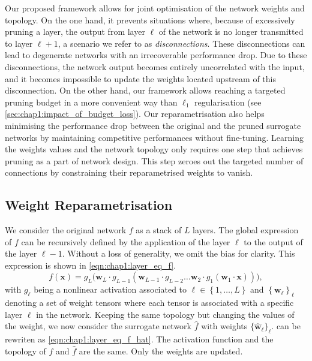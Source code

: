 Our proposed framework allows for joint optimisation of the network weights and
topology. On the one hand, it prevents situations where, because of excessively
pruning a layer, the output from layer $\ell$ of the network is no longer
transmitted to layer $\ell+1$, a scenario we refer to as \emph{disconnections}.
These disconnections can lead to degenerate networks with an irrecoverable
performance drop. Due to these disconnections, the network output becomes
entirely uncorrelated with the input, and it becomes impossible to update the
weights located upstream of this disconnection. On the other hand, our framework
allows reaching a targeted pruning budget in a more convenient way than $\ell_1$
regularisation (see \cref{sec:chap1:impact_of_budget_loss}). Our
reparametrisation also helps minimising the performance drop between the
original and the pruned surrogate networks by maintaining competitive
performances without fine-tuning. Learning the weights values and the network
topology only requires one step that achieves pruning as a part of network
design. This step zeroes out the targeted number of connections by constraining
their reparametrised weights to vanish.


\subsection{Weight Reparametrisation}
\label{sec:chap1:weight_reparam}

We consider the original network $f$ as a stack of $L$ layers. The global
expression of $f$ can be recursively defined by the application of the layer
$\ell$ to the output of the layer $\ell-1$. Without a loss of generality, we
omit the bias for clarity. This expression is shown in
\cref{eqn:chap1:layer_eq_f}.
\begin{equation}
  \label{eqn:chap1:layer_eq_f}
  f(\mathbf{x}) = g_L \big(\mathbf{w}_L \cdot g_{L-1}(\mathbf{w}_{L-1} \cdot g_{L-2} \dots
  \mathbf{w}_2 \cdot g_1(\mathbf{w}_1 \cdot \mathbf{x}))\big),
\end{equation}
\noindent with $g_\ell$ being a nonlinear activation associated to $\ell \in
  \left\{ 1,\dots, L \right\}$ and $\left\{ \mathbf{w}_\ell \right\}_\ell$
denoting a set of weight tensors where each tensor is associated with a specific
layer $\ell$ in the network. Keeping the same topology but changing the values
of the weight, we now consider the surrogate network $\hat{f}$ with weights
$\{\mathbf{\hat{w}}_\ell\}_\ell$.  can be rewriten as
\cref{eqn:chap1:layer_eq_f_hat}. The activation function and the topology of $f$
and $\hat{f}$ are the same. Only the weights are updated.

